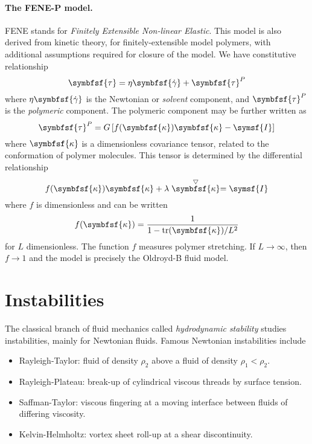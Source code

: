 \documentclass{jknotes}
\begin{document}
\paragraph{The FENE-P model.}
FENE stands for \emph{Finitely Extensible Non-linear Elastic}. This model is
also derived from kinetic theory, for finitely-extensible model polymers, with
additional assumptions required for closure of the model. We have constitutive
relationship
\begin{equation}
	\symbfsf{\tau} = \eta \symbfsf{\srate} + \symbfsf{\tau}^P
\end{equation}
where $\eta \symbfsf{\srate}$ is the Newtonian or \emph{solvent} component,
and $\symbfsf{\tau}^P$ is the \emph{polymeric} component. The polymeric
component may be further written as
\begin{equation}
	\symbfsf{\tau}^P = G\left[ f(\symbfsf{\kappa})\symbfsf{\kappa} -
	\symsf{I}\right]
\end{equation}
where $\symbfsf{\kappa}$ is a dimensionless covariance tensor, related to the
conformation of polymer molecules. This tensor is determined by the
differential relationship
\begin{equation}
	f(\symbfsf{\kappa})\symbfsf{\kappa} +
	\lambda\stackrel{\bigtriangledown}{\symbfsf{\kappa}} = \symsf{I}
\end{equation}
where $f$ is dimensionless and can be written
\begin{equation}
	f(\symbfsf{\kappa}) = \frac{1}{1- \text{tr}(\symbfsf{\kappa})/L^2}
\end{equation}
for $L$ dimensionless. The function $f$ measures polymer stretching. If $L \to
\infty$, then $f \to 1$ and the model is precisely the Oldroyd-B fluid model.

\section{Instabilities}
The classical branch of fluid mechanics called \emph{hydrodynamic stability}
studies instabilities, mainly for Newtonian fluids. Famous Newtonian
instabilities include
\begin{itemize}
	\item Rayleigh-Taylor: fluid of density $\rho_2$ above a fluid of density
		$\rho_1 < \rho_2$.
	\item Rayleigh-Plateau: break-up of cylindrical viscous threads by surface
		tension.
	\item Saffman-Taylor: viscous fingering at a moving interface between
		fluids of differing viscosity.
	\item Kelvin-Helmholtz: vortex sheet roll-up at a shear discontinuity.
\end{itemize}
\end{document}
